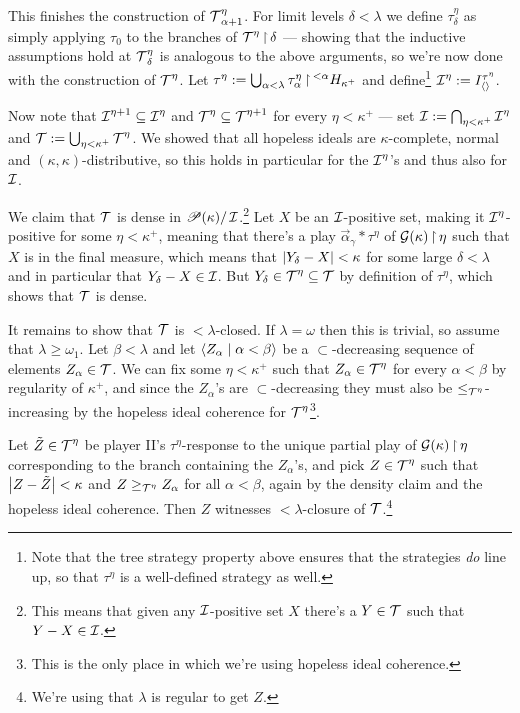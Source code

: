 \documentclass[../../main]{subfiles}
\begin{document}
{\qquad This finishes the construction of $\operatorname{\mathcal T}^\eta_{\alpha+1}$. For limit levels $\delta<\lambda$ we define $\tau^\eta_\delta$ as simply applying $\tau_0$ to the branches of $\operatorname{\mathcal T}^\eta\operatorname{\upharpoonright}\delta$ --- showing that the inductive assumptions hold at $\operatorname{\mathcal T}^\eta_\delta$ is analogous to the above arguments, so we're now done with the construction of $\operatorname{\mathcal T}^\eta$. Let $\tau^\eta:=\bigcup_{\alpha<\lambda}\tau^\eta_\alpha\operatorname{\upharpoonright}{^{<\alpha}H_{\kappa^+}}$ and define\footnote{Note that the tree strategy property above ensures that the strategies \textit{do} line up, so that $\tau^\eta$ is a well-defined strategy as well.} $\operatorname{\mathcal I}^\eta:=I_{\langle \rangle}^{\tau^\eta}$.

\qquad Now note that $\operatorname{\mathcal I}^{\eta+1}\subseteq\operatorname{\mathcal I}^\eta$ and $\operatorname{\mathcal T}^\eta\subseteq\operatorname{\mathcal T}^{\eta+1}$ for every $\eta<\kappa^+$ --- set $\operatorname{\mathcal I}:=\bigcap_{\eta<\kappa^+}\operatorname{\mathcal I}^\eta$ and $\operatorname{\mathcal T}:=\bigcup_{\eta<\kappa^+}\operatorname{\mathcal T}^\eta$. We showed that all hopeless ideals are $\kappa$-complete, normal and $(\kappa,\kappa)$-distributive, so this holds in particular for the $\operatorname{\mathcal I}^\eta$'s and thus also for $\operatorname{\mathcal I}$.

\qquad We claim that $\operatorname{\mathcal T}$ is dense in $\mathscr P(\kappa)/\operatorname{\mathcal I}$.\footnote{This means that given any $\operatorname{\mathcal I}$-positive set $X$ there's a $Y\in\operatorname{\mathcal T}$ such that $Y-X\in\operatorname{\mathcal I}$.} Let $X$ be an $\operatorname{\mathcal I}$-positive set, making it $\operatorname{\mathcal I}^\eta$-positive for some $\eta<\kappa^+$, meaning that there's a play $\vec\alpha_\gamma*\tau^\eta$ of $\operatorname{\mathcal G}(\kappa)\operatorname{\upharpoonright}\eta$ such that $X$ is in the final measure, which means that $\left|Y_\delta-X\right|<\kappa$ for some large $\delta<\lambda$ and in particular that $Y_\delta-X\in\operatorname{\mathcal I}$. But $Y_\delta\in\operatorname{\mathcal T}^\eta\subseteq\operatorname{\mathcal T}$ by definition of $\tau^\eta$, which shows that $\operatorname{\mathcal T}$ is dense.

\qquad It remains to show that $\operatorname{\mathcal T}$ is ${<}\lambda$-closed. If $\lambda=\omega$ then this is trivial, so assume that $\lambda\geq\omega_1$. Let $\beta<\lambda$ and let $\langle Z_\alpha\mid\alpha<\beta\rangle$ be a $\subset$-decreasing sequence of elements $Z_\alpha\in\operatorname{\mathcal T}$. We can fix some $\eta<\kappa^+$ such that $Z_\alpha\in\operatorname{\mathcal T}^\eta$ for every $\alpha<\beta$ by regularity of $\kappa^+$, and since the $Z_\alpha$'s are $\subset$-decreasing they must also be $\leq_{\operatorname{\mathcal T}^\eta}$-increasing by the hopeless ideal coherence for $\operatorname{\mathcal T}^\eta$\footnote{This is the only place in which we're using hopeless ideal coherence.}.
	
\qquad Let $\tilde Z\in\operatorname{\mathcal T}^\eta$ be player II's $\tau^\eta$-response to the unique partial play of $\operatorname{\mathcal G}(\kappa)\operatorname{\upharpoonright}\eta$ corresponding to the branch containing the $Z_\alpha$'s, and pick $Z\in\operatorname{\mathcal T}^\eta$ such that $\left|Z-\tilde Z\right|<\kappa$ and $Z\geq_{\operatorname{\mathcal T}^\eta}Z_\alpha$ for all $\alpha<\beta$, again by the density claim and the hopeless ideal coherence. Then $Z$ witnesses ${<}\lambda$-closure of $\operatorname{\mathcal T}$.\footnote{We're using that $\lambda$ is regular to get $Z$.}
}
\end{document}
